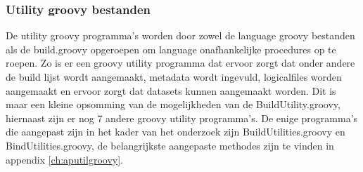 \subsubsection{Utility groovy bestanden}
De utility groovy programma's worden door zowel de language groovy bestanden als de build.groovy opgeroepen om language onafhankelijke procedures op te roepen. Zo is er een groovy utility programma dat ervoor zorgt dat onder andere de build lijst wordt aangemaakt, metadata wordt ingevuld, logicalfiles worden aangemaakt en ervoor zorgt dat datasets kunnen aangemaakt worden. Dit is maar een kleine opsomming van de mogelijkheden van de BuildUtility.groovy, hiernaast zijn er nog 7 andere groovy utility programma's. De enige programma's die aangepast zijn in het kader van het onderzoek zijn BuildUtilities.groovy en BindUtilities.groovy, de belangrijkste aangepaste methodes zijn te vinden in appendix \ref{ch:aputilgroovy}. 
\\ \\
